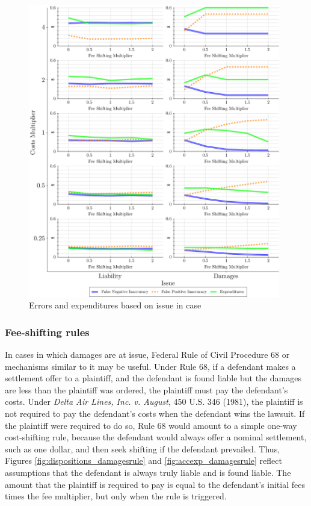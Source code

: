 \documentclass{article}
\begin{document}
\begin{figure}
\begin{minipage}{0.48\textwidth}
        \includegraphics[width=0.98\textwidth, scale=0.70, trim={0in 0in 0in 0in}, clip]{../Figures/Accuracy and Expenditures Varying Issue} %
        \caption{Errors and expenditures based on issue in case}
		\label{fig:accexp_issue}
    \end{minipage}
\end{figure}

\subsubsection{Fee-shifting rules}

In cases in which damages are at issue, Federal Rule of Civil Procedure 68 or mechanisms similar to it may be useful. Under Rule 68, if a defendant makes a settlement offer to a plaintiff, and the defendant is found liable but the damages are less than the plaintiff was ordered, the plaintiff must pay the defendant's costs. Under \textit{Delta Air Lines, Inc. v. August}, 450 U.S. 346 (1981), the plaintiff is not required to pay the defendant's costs when the defendant wins the lawsuit. If the plaintiff were required to do so, Rule 68 would amount to a simple one-way cost-shifting rule, because the defendant would always offer a nominal settlement, such as one dollar, and then seek shifting if the defendant prevailed. Thus, Figures \ref{fig:dispositions_damagesrule} and \ref{fig:accexp_damagesrule} reflect assumptions that the defendant is always truly liable and is found liable. The amount that the plaintiff is required to pay is equal to the defendant's initial fees times the fee multiplier, but only when the rule is triggered.  
\end{document}
